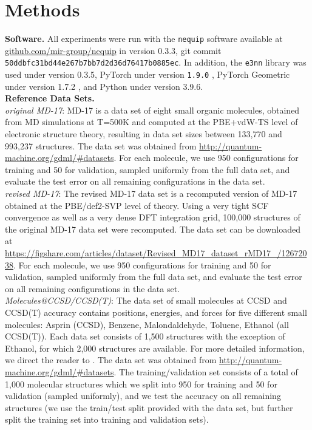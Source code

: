 \documentclass[%
reprint,
superscriptaddress,
nofootinbib,
amsmath,amssymb,
aps,
prl,
]{revtex4-1}
\begin{document}
\section{Methods}

\textbf{Software.} All experiments were run with the \texttt{nequip} software available at \url{github.com/mir-group/nequip} in version 0.3.3, git commit \texttt{50ddbfc31bd44e267b7bb7d2d36d76417b0885ec}. In addition, the \texttt{e3nn} library \cite{mario_geiger_2021_4735637} was used under version 0.3.5, PyTorch under version \texttt{1.9.0} \cite{paszke2019pytorch}, PyTorch Geometric under version 1.7.2 \cite{fey2019fast}, and Python under version 3.9.6.\\

\textbf{Reference Data Sets.} \\

\textit{original MD-17}: MD-17 \cite{chmiela2017machine, schutt2017quantum, sgdml} is a data set of eight small organic molecules, obtained from MD simulations at T=500K and computed at the PBE+vdW-TS level of electronic structure theory, resulting in data set sizes between 133,770 and 993,237 structures. The data set was obtained from \url{http://quantum-machine.org/gdml/#datasets}. For each molecule, we use 950 configurations for training and 50 for validation, sampled uniformly from the full data set, and evaluate the test error on all remaining configurations in the data set. \\

\textit{revised MD-17}: The revised MD-17 data set is a recomputed version of MD-17 obtained at the PBE/def2-SVP level of theory. Using a very tight SCF convergence as well as a very dense DFT integration grid, 100,000 structures \cite{christensen2020role} of the original MD-17 data set were recomputed. The data set can be downloaded at \url{https://figshare.com/articles/dataset/Revised_MD17_dataset_rMD17_/12672038}. For each molecule, we use 950 configurations for training and 50 for validation, sampled uniformly from the full data set, and evaluate the test error on all remaining configurations in the data set.\\

\textit{Molecules@CCSD/CCSD(T)}: The data set of small molecules at CCSD and CCSD(T) accuracy \cite{sgdml} contains positions, energies, and forces for five different small molecules: Asprin (CCSD), Benzene, Malondaldehyde, Toluene, Ethanol (all CCSD(T)). Each data set consists of 1,500 structures with the exception of Ethanol, for which 2,000 structures are available. For more detailed information, we direct the reader to \cite{sgdml}. The data set was obtained from \url{http://quantum-machine.org/gdml/#datasets}. The training/validation set consists of a total of 1,000 molecular structures which we split into 950 for training and 50 for validation (sampled uniformly), and we test the accuracy on all remaining structures (we use the train/test split provided with the data set, but further split the training set into training and validation sets).  \\
\end{document}

